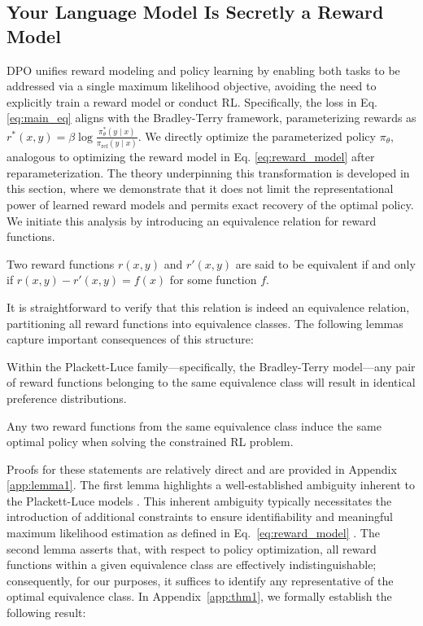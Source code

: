 \label{sec:theory}

\subsection{Your Language Model Is Secretly a Reward Model} DPO unifies reward modeling and policy learning by enabling both tasks to be addressed via a single maximum likelihood objective, avoiding the need to explicitly train a reward model or conduct RL. Specifically, the loss in Eq. \ref{eq:main_eq} aligns with the Bradley-Terry framework, parameterizing rewards as $r^*(x, y) = \beta \log\frac{\pi^*_\theta(y \mid x)}{\pi_\text{ref}(y \mid x)}$. We directly optimize the parameterized policy $\pi_{\theta}$, analogous to optimizing the reward model in Eq. \ref{eq:reward_model} after reparameterization. The theory underpinning this transformation is developed in this section, where we demonstrate that it does not limit the representational power of learned reward models and permits exact recovery of the optimal policy. We initiate this analysis by introducing an equivalence relation for reward functions.

\begin{definition}
Two reward functions $r(x, y)$ and $r'(x, y)$ are said to be equivalent if and only if ${r(x, y)-r'(x, y) = f(x)}$ for some function $f$.
\end{definition}

It is straightforward to verify that this relation is indeed an equivalence relation, partitioning all reward functions into equivalence classes. The following lemmas capture important consequences of this structure:

\begin{lemma}\label{lemma:same_prefrence}
Within the Plackett-Luce family—specifically, the Bradley-Terry model—any pair of reward functions belonging to the same equivalence class will result in identical preference distributions.
\end{lemma}

\begin{lemma}\label{lemma:same_policy}
    Any two reward functions from the same equivalence class induce the same optimal policy when solving the constrained RL problem.
\end{lemma}

Proofs for these statements are relatively direct and are provided in Appendix \ref{app:lemma1}. The first lemma highlights a well-established ambiguity inherent to the Plackett-Luce models \cite{plackett1975analysis}. This inherent ambiguity typically necessitates the introduction of additional constraints to ensure identifiability and meaningful maximum likelihood estimation as defined in Eq.~\ref{eq:reward_model} \cite{bong2022generalized}. The second lemma asserts that, with respect to policy optimization, all reward functions within a given equivalence class are effectively indistinguishable; consequently, for our purposes, it suffices to identify any representative of the optimal equivalence class. In Appendix~\ref{app:thm1}, we formally establish the following result:

